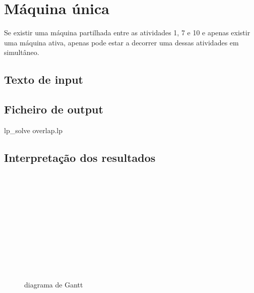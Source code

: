\documentclass[a4paper]{report}
\begin{document}
\section{Máquina única}
Se existir uma máquina partilhada entre as atividades 1, 7 e 10 e apenas existir
uma máquina ativa, apenas pode estar a decorrer uma dessas atividades em
simultâneo.

\pagebreak
\subsection{Texto de input}


\pagebreak
\subsection{Ficheiro de output}
\bash[stdout]
lp_solve overlap.lp
\END

\subsection{Interpretação dos resultados}
\begin{figure}[H]
    \centering
    \begin{ganttchart}{1}{32}
        \\
        \\

        \\
        \\
        \\
        
        \\
        \\
        
        \\
        
        \\
        
        \\
    \end{ganttchart}
    \caption{diagrama de Gantt}
\end{figure}
\end{document}
